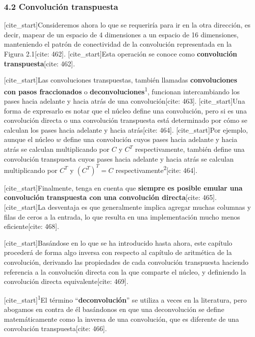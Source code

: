 \documentclass[
  super,
  preprint,
  3p]{elsarticle}
\begin{document}
\subsubsection{4.2 Convolución
transpuesta}\label{convoluciuxf3n-transpuesta}

{[}cite\_start{]}Consideremos ahora lo que se requeriría para ir en la
otra dirección, es decir, mapear de un espacio de 4 dimensiones a un
espacio de 16 dimensiones, manteniendo el patrón de conectividad de la
convolución representada en la Figura 2.1{[}cite: 462{]}.
{[}cite\_start{]}Esta operación se conoce como \textbf{convolución
transpuesta}{[}cite: 462{]}.

{[}cite\_start{]}Las convoluciones transpuestas, también llamadas
\textbf{convoluciones con pasos fraccionados} o
\textbf{deconvoluciones}\textsuperscript{1}, funcionan intercambiando
los pases hacia adelante y hacia atrás de una convolución{[}cite:
463{]}. {[}cite\_start{]}Una forma de expresarlo es notar que el núcleo
define una convolución, pero si es una convolución directa o una
convolución transpuesta está determinado por cómo se calculan los pases
hacia adelante y hacia atrás{[}cite: 464{]}. {[}cite\_start{]}Por
ejemplo, aunque el núcleo \(w\) define una convolución cuyos pases hacia
adelante y hacia atrás se calculan multiplicando por \(C\) y \(C^T\)
respectivamente, también define una convolución transpuesta cuyos pases
hacia adelante y hacia atrás se calculan multiplicando por \(C^T\) y
\((C^T)^T = C\) respectivamente\textsuperscript{2}{[}cite: 464{]}.

{[}cite\_start{]}Finalmente, tenga en cuenta que \textbf{siempre es
posible emular una convolución transpuesta con una convolución
directa}{[}cite: 465{]}. {[}cite\_start{]}La desventaja es que
generalmente implica agregar muchas columnas y filas de ceros a la
entrada, lo que resulta en una implementación mucho menos
eficiente{[}cite: 468{]}.

{[}cite\_start{]}Basándose en lo que se ha introducido hasta ahora, este
capítulo procederá de forma algo inversa con respecto al capítulo de
aritmética de la convolución, derivando las propiedades de cada
convolución transpuesta haciendo referencia a la convolución directa con
la que comparte el núcleo, y definiendo la convolución directa
equivalente{[}cite: 469{]}.

{[}cite\_start{]}\textsuperscript{1}El término
``\textbf{deconvolución}'' se utiliza a veces en la literatura, pero
abogamos en contra de él basándonos en que una deconvolución se define
matemáticamente como la inversa de una convolución, que es diferente de
una convolución transpuesta{[}cite: 466{]}.
\end{document}
